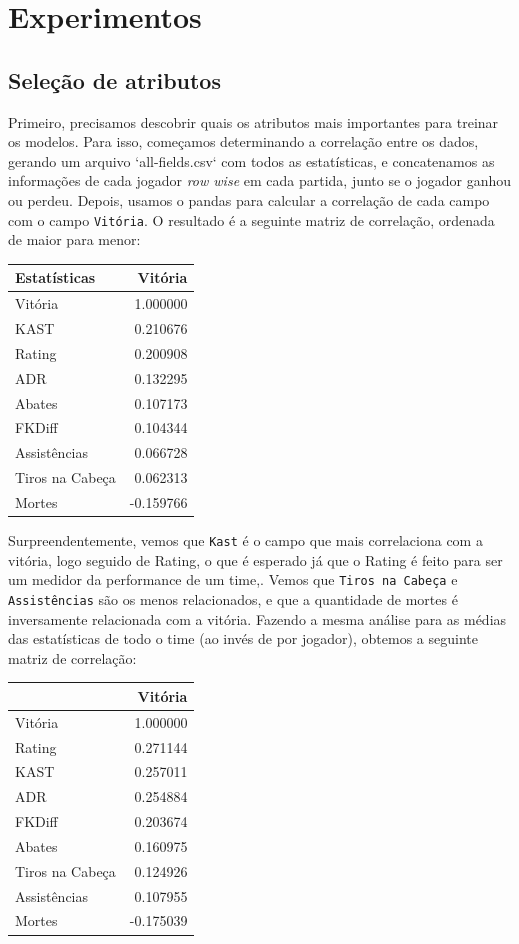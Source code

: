\documentclass[12pt]{article}
\begin{document}
\section{Experimentos}

\subsection{Seleção de atributos}

Primeiro, precisamos descobrir quais os atributos mais importantes para treinar os modelos. Para isso, começamos determinando a correlação entre os dados, gerando um arquivo `all-fields.csv` com todos as estatísticas, e concatenamos as informações de cada jogador \textit{row wise} em cada partida, junto se o jogador ganhou ou perdeu. Depois, usamos o pandas para calcular a correlação de cada campo com o campo \verb+Vitória+. O resultado é a seguinte matriz de correlação, ordenada de maior para menor:

\begin{center}
\begin{tabular}{lr}
\toprule
Estatísticas & Vitória \\
\midrule
Vitória & 1.000000 \\
KAST & 0.210676 \\
Rating & 0.200908 \\
ADR & 0.132295 \\
Abates & 0.107173 \\
FKDiff & 0.104344 \\
Assistências & 0.066728 \\
Tiros na Cabeça & 0.062313 \\
Mortes & -0.159766 \\
\bottomrule
\end{tabular}
\end{center}

Surpreendentemente, vemos que \verb+Kast+ é o campo que mais correlaciona com a vitória, logo seguido de Rating, o que é esperado já que o Rating é feito para ser um medidor da performance de um time,.  Vemos que \verb+Tiros na Cabeça+ e \verb+Assistências+ são os menos relacionados, e que a quantidade de mortes é inversamente relacionada com a vitória. Fazendo a mesma análise para as médias das estatísticas de todo o time (ao invés de por jogador), obtemos a seguinte matriz de correlação:

\begin{center}
\begin{tabular}{lr}
\toprule
 & Vitória \\
\midrule
Vitória & 1.000000 \\
Rating & 0.271144 \\
KAST & 0.257011 \\
ADR & 0.254884 \\
FKDiff & 0.203674 \\
Abates & 0.160975 \\
Tiros na Cabeça & 0.124926 \\
Assistências & 0.107955 \\
Mortes & -0.175039 \\
\bottomrule
\end{tabular}
\end{center}
\end{document}
